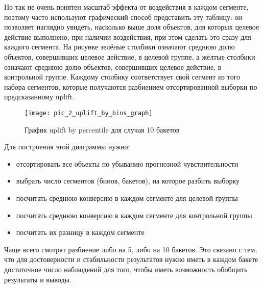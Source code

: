 Но так не очень понятен масштаб эффекта от воздействия в каждом сегменте, поэтому часто используют графический способ представить эту таблицу: он позволяет наглядно увидеть, насколько выше доля объектов, для которых целевое действие выполнено, при наличии воздействия, при этом сделать это сразу для каждого сегмента. На рисунке зелёные столбики означают среднюю долю объектов, совершивших целевое действие, в целевой группе, а жёлтые столбики означают среднюю долю объектов, совершивших целевое действие, в контрольной группе. Каждому столбику соответствует свой сегмент из того набора сегментов, которые получаются разбиением отсортированной выборки по предсказанному uplift.

\begin{figure}[ht]
\centering
\texttt{[image: pic\_2\_uplift\_by\_bins\_graph]}
\centering
\caption{График uplift by percentile для случая 10 бакетов}
\label{fig:pic_2_uplift_by_bins_graph}
\end{figure}

Для построения этой диаграммы нужно:
\begin{itemize}
    \item отсортировать все объекты по убыванию прогнозной чувствительности
    \item выбрать число сегментов (бинов, бакетов), на которое разбить выборку
    \item посчитать среднюю конверсию в каждом сегменте для целевой группы
    \item посчитать среднюю конверсию в каждом сегменте для контрольной группы
    \item посчитать их разницу в каждом сегменте
\end{itemize}

Чаще всего смотрят разбиение либо на 5, либо на 10 бакетов. Это связано с тем, что для достоверности и стабильности результатов нужно иметь в каждом бакете достаточное число наблюдений для того, чтобы иметь возможность обобщить результаты и выводы.

